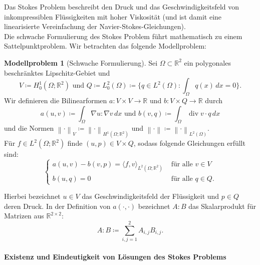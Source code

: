 \documentclass[a4paper]{scrartcl}
\newcommand{\real}{\mathbb{R}}
\newcommand{\Hzero}{H_0^1}
\newcommand{\Ltwo}{L^2}
\newcommand{\dx}{\,dx}
\newcommand{\vnorm}[1]{\left\lVert#1\right\rVert_V}
\newcommand{\norm}[1]{\left\lVert#1\right\rVert}
\newcommand{\black}{\color{black}}
\newcommand{\blue}{\color{blue}}
\DeclareMathOperator{\divOp}{div}
\theoremstyle{plain}
\theoremstyle{definition}
\newtheorem{modellproblem}{Modellproblem}
\theoremstyle{remark}
\begin{document}
Das Stokes Problem beschreibt den Druck und das Geschwindigkeitsfeld
von  inkompressiblen Flüssigkeiten mit hoher Viskosität (und ist damit
eine linearisierte Vereinfachung der Navier-Stokes-Gleichungen).\\ 

\noindent Die schwache Formulierung des Stokes Problem führt
mathematisch zu einem Sattelpunktproblem. Wir betrachten das folgende Modellproblem:

\black
\begin{modellproblem}[Schwache Formulierung] \label{problem:1}
  Sei \(\Omega \subset \real^2\) ein polygonales beschränktes
  Lipschitz-Gebiet und  
  \[V \coloneqq \Hzero(\Omega; \real^2) \text{ und } Q \coloneqq
  \Ltwo_0(\Omega) \coloneqq \{q \in \Ltwo(\Omega): \int_\Omega q(x)
  \dx = 0\}.\]
  Wir definieren die Bilinearformen \(a \colon V\times V \rightarrow \real\)
  und \(b \colon V\times Q \rightarrow \real\) durch
  \begin{equation}
    \label{eq:2}
    a(u,v) \coloneqq \int_\Omega \nabla u : \nabla v \dx 
    \text{ und }
    b(v,q) \coloneqq \int_\Omega \divOp v \cdot q \dx \nonumber
  \end{equation}
  und die Normen \(\vnorm{\cdot} \coloneqq \norm{\cdot}_{H^1(\Omega;
    \real^2)}\) und \(\norm{\cdot} \coloneqq \norm{\cdot}_{\Ltwo(\Omega)}\).\\
  Für \(f\in \Ltwo(\Omega; \real^2)\) finde \((u,p) \in V\times Q\), sodass folgende Gleichungen erfüllt sind: 
  \begin{equation}
    \label{eq:3}
    \begin{cases}
      a(u,v) - b(v,p) = \langle f, v \rangle_{\Ltwo(\Omega;\real^2)} &
      \text{ für alle } v \in V \\
      b(u,q) = 0 & \text{ für alle } q \in Q.
    \end{cases}
  \end{equation}
\end{modellproblem}

\blue
\noindent Hierbei bezeichnet \(u \in V\) das Geschwindigkeitsfeld der
Flüssigkeit und \(p\in Q\) deren Druck. In der Definition von
\(a(\cdot, \cdot)\) bezeichnet \(A:B\) das Skalarprodukt für Matrizen
aus \(\real^{2\times 2}\): 
\black
\[ A:B \coloneqq \sum_{i,j = 1}^2 A_{i,j}B_{i,j}.\]



\paragraph{Existenz und Eindeutigkeit von Lösungen des Stokes Problems}
\label{sec:exist-und-eind}
\end{document}
